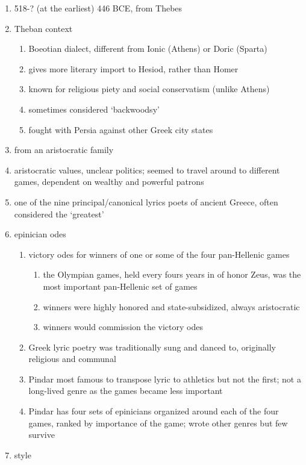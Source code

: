 \documentclass[12pt]{article}
\begin{document}
\begin{enumerate}
\item 518-? (at the earliest) 446 BCE, from Thebes
\item Theban context
    \begin{enumerate}
    \item Boeotian dialect, different from Ionic (Athens) or Doric (Sparta)
    \item gives more literary import to Hesiod, rather than Homer
    \item known for religious piety and social conservatism (unlike Athens)
    \item sometimes considered `backwoodsy'
    \item fought with Persia against other Greek city states
    \end{enumerate}
\item from an aristocratic family
\item aristocratic values, unclear politics; seemed to travel around to different games, dependent on wealthy and powerful patrons
\item one of the nine principal/canonical lyrics poets of ancient Greece, often considered the `greatest'
\item epinician odes
    \begin{enumerate}
    \item victory odes for winners of one or some of the four pan-Hellenic games 
        \begin{enumerate}
        \item the Olympian games, held every fours years in of honor Zeus, was the most important pan-Hellenic set of games
        \item winners were highly honored and state-subsidized, always aristocratic
        \item winners would commission the victory odes
        \end{enumerate}
    \item Greek lyric poetry was traditionally sung and danced to, originally religious and communal
    \item Pindar most famous to transpose lyric to athletics but not the first; not a long-lived genre as the games became less important
    \item Pindar has four sets of epinicians organized around each of the four games, ranked by importance of the game; wrote other genres but few survive
    \end{enumerate}
\item style

\end{enumerate}
\end{document}
